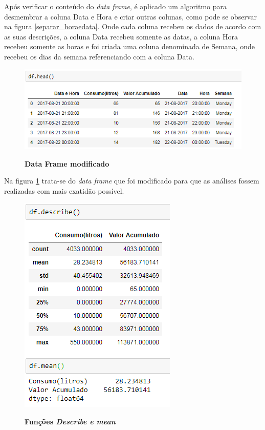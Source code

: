 \par Após verificar o conteúdo do \emph{data frame}, é aplicado um algoritmo para desmembrar a coluna Data e Hora e criar outras colunas, como pode se observar na figura \ref{separar_horaedata}. Onde cada coluna recebeu os dados de acordo com as suas descrições, a coluna Data recebeu somente as datas, a coluna Hora recebeu somente as horas e foi criada uma coluna denominada de Semana, onde recebeu os dias da semana referenciando com a coluna Data.
\begin{figure}[ht]
	\caption{\textbf{Data Frame modificado}}
	\centering
		\includegraphics[scale=1, keepaspectratio]{figuras/mostrandoarquivoaposorganizacao}
		\label{arquivo_orga}
\end{figure}

\par Na figura \ref{arquivo_orga} trata-se do \emph{data frame} que foi modificado para que as análises fossem realizadas com mais exatidão possível.

\begin{figure}[ht]
	\caption{\textbf{Funções \emph{Describe e mean}}}
	\centering
		\includegraphics[scale=1, keepaspectratio]{figuras/describe-mean}
		\label{describe_mean}
\end{figure}

